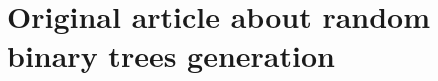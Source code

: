 \documentclass[twoside,openright,titlepage,fleqn,
	headinclude,11pt,a4paper,BCOR5mm,footinclude
	]{scrbook}
\begin{document}
\section{Original article about random binary trees generation}



% 

% 
\end{document}

